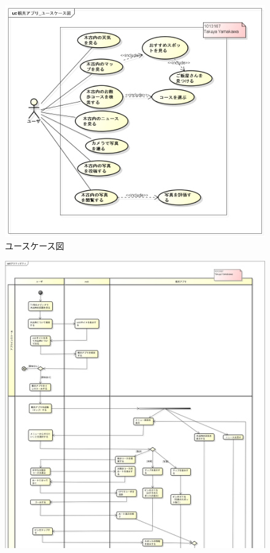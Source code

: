 \documentclass[openany,11pt,papersize]{jsbook}
\begin{document}
\begin{appendix}
    \begin{figure}{}
        \begin{center}
\includegraphics[width=14cm, bb=0 0 520 388]{project_usecase2.png}
        \end{center}
         \caption{ユースケース図}
 \label{fig:one}
      \end{figure}
 

    \begin{figure}{}
        \begin{center}
\includegraphics[width=20cm, bb=0 0 1880 2077]{project_activity2.2-1.png}
        \end{center}
 \label{fig:one}
      \end{figure}
      


\end{appendix}
\end{document}
